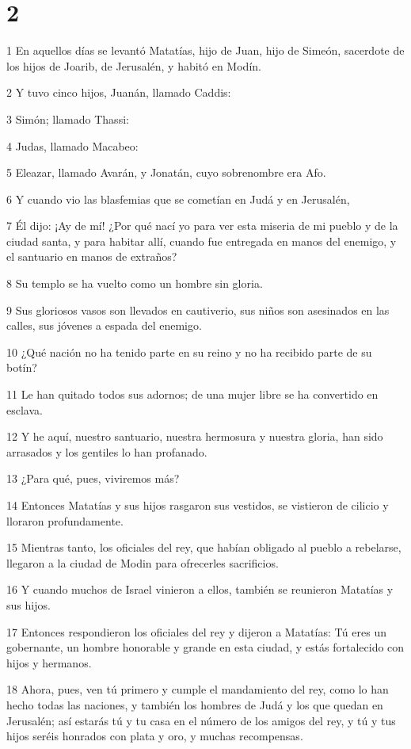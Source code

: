 \chapter{2}

\par 1 En aquellos días se levantó Matatías, hijo de Juan, hijo de Simeón, sacerdote de los hijos de Joarib, de Jerusalén, y habitó en Modín.
\par 2 Y tuvo cinco hijos, Juanán, llamado Caddis:
\par 3 Simón; llamado Thassi:
\par 4 Judas, llamado Macabeo:
\par 5 Eleazar, llamado Avarán, y Jonatán, cuyo sobrenombre era Afo.
\par 6 Y cuando vio las blasfemias que se cometían en Judá y en Jerusalén,
\par 7 Él dijo: ¡Ay de mí! ¿Por qué nací yo para ver esta miseria de mi pueblo y de la ciudad santa, y para habitar allí, cuando fue entregada en manos del enemigo, y el santuario en manos de extraños?
\par 8 Su templo se ha vuelto como un hombre sin gloria.
\par 9 Sus gloriosos vasos son llevados en cautiverio, sus niños son asesinados en las calles, sus jóvenes a espada del enemigo.
\par 10 ¿Qué nación no ha tenido parte en su reino y no ha recibido parte de su botín?
\par 11 Le han quitado todos sus adornos; de una mujer libre se ha convertido en esclava.
\par 12 Y he aquí, nuestro santuario, nuestra hermosura y nuestra gloria, han sido arrasados ​​y los gentiles lo han profanado.
\par 13 ¿Para qué, pues, viviremos más?
\par 14 Entonces Matatías y sus hijos rasgaron sus vestidos, se vistieron de cilicio y lloraron profundamente.
\par 15 Mientras tanto, los oficiales del rey, que habían obligado al pueblo a rebelarse, llegaron a la ciudad de Modin para ofrecerles sacrificios.
\par 16 Y cuando muchos de Israel vinieron a ellos, también se reunieron Matatías y sus hijos.
\par 17 Entonces respondieron los oficiales del rey y dijeron a Matatías: Tú eres un gobernante, un hombre honorable y grande en esta ciudad, y estás fortalecido con hijos y hermanos.
\par 18 Ahora, pues, ven tú primero y cumple el mandamiento del rey, como lo han hecho todas las naciones, y también los hombres de Judá y los que quedan en Jerusalén; así estarás tú y tu casa en el número de los amigos del rey, y tú y tus hijos seréis honrados con plata y oro, y muchas recompensas.
